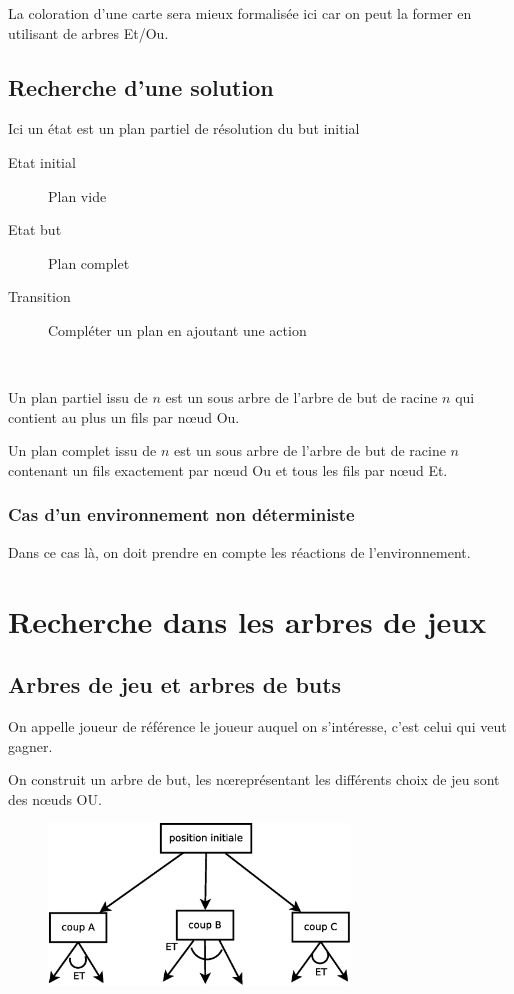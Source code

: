 \documentclass[12pt,a4paper,openany]{book}
\begin{document}
	\begin{remarque}
	La coloration d'une carte sera mieux formalisée ici car on peut la former en utilisant de arbres Et/Ou.
		\end{remarque}

	\section{Recherche d'une solution}
	Ici un état est un plan partiel de résolution du but initial
	\begin{description}
		\item[Etat initial]Plan vide
		\item[Etat but] Plan complet
		\item[Transition] Compléter un plan en ajoutant une action 
	\end{description}
	
~
	\begin{definition}
		Un plan partiel issu de $n$ est un sous arbre de l'arbre de but de racine $n$ qui contient au plus un fils par nœud Ou.
	\end{definition}

	\begin{definition}
		Un plan complet issu de $n$ est un sous arbre de l'arbre de but de racine $n$ contenant un fils exactement par nœud Ou et tous les fils par
		nœud Et.
	\end{definition}

	\subsection{Cas d'un environnement non déterministe}
	Dans ce cas là, on doit prendre en compte les réactions de l'environnement.
	\chapter{Recherche dans les arbres de jeux}
	\section{Arbres de jeu et arbres de buts}
		On appelle joueur de référence le joueur auquel on
		s'intéresse, c'est celui qui veut gagner.

		On construit un arbre de but, les n\oe{}représentant
		les différents choix de jeu sont des n\oe{}uds OU.
		 \begin{figure}[H]
			 \centering
			 \includegraphics[width=8cm]{ch4_1_1.eps}
		 \end{figure}
\end{document}
